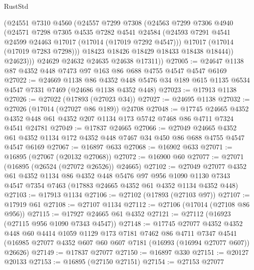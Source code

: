 \begin{lexlean}{RustStd}
\begin{coremodule}
{\begin{coremodule}
{{{{{{{{{{{{{{{{{{{{{{{{{{{{{{{{{{{{{{{{{{{{{{{{{{{{{{{            (@24551
              @7310
              @4560
              (@24557
                @7299
                @7308
                (@24563
                  @7299
                  @7306
                  @4940
                  (@24571
                    @7298
                    @7305
                    @4535
                    @7282
                    @4541
                    @24584
                    (@24593 @7291 @4541 @24599 @24463 @17017 (@17014 (@17019 @7292 @4547)))
                    @17017
                    (@17014 (@17019 @7283 @7298)))
                  @18423
                  @18426
                  @18429
                  @18433
                  @18438
                  @18444))
              @24623)))
        @24629
        @24632
        @24635
        @24638
        @17311))
@27005 := @24647 @1138 @87 @4352 @448 @7473 @97 @163 @86 @688 @4755 @4547 @4547 @6169
@27022 := @24669
    @1138
    @86
    @4352
    @448
    @5476
    @34
    @189
    @615
    @1135
    @6534
    @4547
    @7331
    @7469
    (@24686 @1138 @4352 @448)
@27023 := @17913 @1138
@27026 := @27022 (@17893 (@27023 @34))
@27027 := @24695 @1138
@27032 := @27026 (@17014 (@27027 @86 @189)) @24708
@27048 := @17745
    @24665
    @4352
    @4352
    @448
    @61
    @4352
    @207
    @1134
    @173
    @5742
    @7468
    @86
    @4711
    @7324
    @4541
    @24781
@27049 := @17837 @24665
@27066 := @27049
    @24665
    @4352
    @61
    @4352
    @1134
    @172
    @4352
    @448
    @7467
    @34
    @450
    @86
    @688
    @4755
    @4547
    @4547
    @6169
@27067 := @16897 @633
@27068 := @16902 @633
@27071 := @16895 (@27067 (@20132 @27068))
@27072 := @16900 @60
@27077 := @27071 (@16895 (@26524 (@27072 @26526)) @24665)
@27102 := @27049
    @27077
    @4352
    @61
    @4352
    @1134
    @86
    @4352
    @448
    @5476
    @97
    @956
    @1090
    @1130
    @7343
    @4547
    @7354
    @7463
    (@17883 @24665 @4352 @61 @4352 @1134 @4352 @448)
@27103 := @17913 @1134
@27106 := @27102 (@17893 (@27103 @97))
@27107 := @17919 @61
@27108 := @27107 @1134
@27112 := @27106 (@17014 (@27108 @86 @956))
@27115 := @17927 @24665 @61 @4352
@27121 := @27112 (@16923 (@27115 @956 @1090 @7343 @4547))
@27148 := @17745
    @27077
    @4352
    @4352
    @448
    @60
    @4414
    @1059
    @1129
    @173
    @7181
    @7462
    @86
    @4711
    @7347
    @4541
    (@16985 @27077 @4352 @607 @60 @607 @7181 (@16993 (@16994 @27077 @607)) @26626)
@27149 := @17837 @27077
@27150 := @16897 @330
@27151 := @20127 @20133
@27153 := @16895 (@27150 @27151)
@27154 := @27153 @27077
}}}}}}}}}}}}}}}}}}}}}}}}}}}}}}}}}}}}}}}}}}}}}}}}}}}}}}}
\end{coremodule}}
\end{coremodule}
\end{lexlean}
